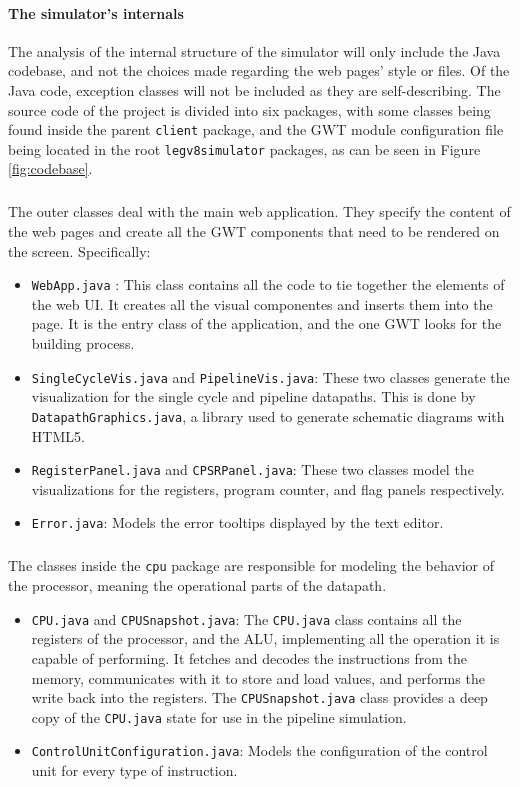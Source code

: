 \paragraph{The simulator's internals}
The analysis of the internal structure of the simulator will only include the Java codebase, and not the choices made regarding the web pages' style or files. Of the Java code, exception classes will not be included as they are self-describing.
The source code of the project is divided into six packages, with some classes being found inside the parent \verb|client| package, and the GWT module configuration file being located in the root \verb|legv8simulator| packages, as can be seen in Figure \ref{fig:codebase}.
\subparagraph{}
The outer classes deal with the main web application. They specify the content of the web pages and create all the GWT components that need to be rendered on the screen. Specifically:
\begin{itemize}
	\item \verb|WebApp.java| : This class contains all the code to tie together the elements of the web UI. It creates all the visual componentes and inserts them into the page. It is the entry class of the application, and the one GWT looks for the building process.
	\item \verb|SingleCycleVis.java| and \verb|PipelineVis.java|:  These two classes generate the visualization for the single cycle and pipeline datapaths. This is done by \verb|DatapathGraphics.java|, a library used to generate schematic diagrams with HTML5.
	\item \verb|RegisterPanel.java| and \verb|CPSRPanel.java|:  These two classes model the visualizations for the registers, program counter, and flag panels respectively.
	\item \verb|Error.java|:  Models the error tooltips displayed by the text editor.
\end{itemize}
\subparagraph{}
The classes inside the \verb|cpu| package are responsible for modeling the behavior of the processor, meaning the operational parts of the datapath.
\begin{itemize}
\item \verb|CPU.java| and \verb|CPUSnapshot.java|:  The \verb|CPU.java| class contains all the registers of the processor, and the ALU, implementing all the operation it is capable of performing. It fetches and decodes the instructions from the memory, communicates with it to store and load values, and performs the write back into the registers. The \verb|CPUSnapshot.java| class provides a deep copy of the \verb|CPU.java| state for use in the pipeline simulation.
\item \verb|ControlUnitConfiguration.java|:  Models the configuration of the control unit for every type of instruction.
\end{itemize}
